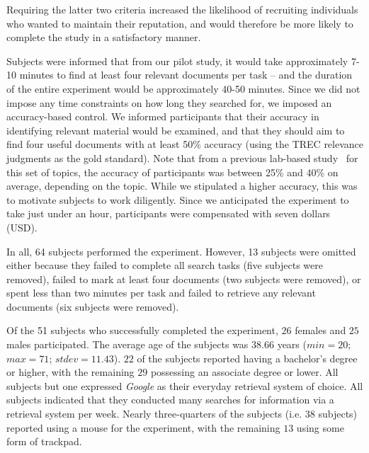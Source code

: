 Requiring the latter two criteria increased the likelihood of recruiting individuals who wanted to maintain their reputation, and would therefore be more likely to complete the study in a satisfactory manner. 

Subjects were informed that from our pilot study, it would take approximately 7-10 minutes to find at least four relevant documents per task -- and the duration of the entire experiment would be approximately 40-50 minutes. Since we did not impose any time constraints on how long they searched for, we imposed an accuracy-based control. We informed participants that their accuracy in identifying relevant material would be examined, and that they should aim to find four useful documents with at least 50\% accuracy (using the TREC relevance judgments as the gold standard). Note that from a previous lab-based study~\cite{maxwell2017snippet_length} for this set of topics, the accuracy of participants was between 25\% and 40\% on average, depending on the topic. While we stipulated a higher accuracy, this was to motivate subjects to work diligently. Since we anticipated the experiment to take just under an hour, participants were compensated with seven dollars (USD).

In all, 64 subjects performed the experiment. However, 13 subjects were omitted either because they failed to complete all search tasks (five subjects were removed), failed to mark at least four documents (two subjects were removed), or spent less than two minutes per task and failed to retrieve any relevant documents (six subjects were removed). 

Of the 51 subjects who successfully completed the experiment, $26$ females and $25$ males participated. The average age of the subjects was $38.66$ years ($min=20$; $max=71$; $stdev=11.43$). $22$ of the subjects reported having a bachelor's degree or higher, with the remaining $29$ possessing an associate degree or lower. All subjects but one expressed \emph{Google} as their everyday retrieval system of choice. All subjects indicated that they conducted many searches for information via a retrieval system per week. Nearly three-quarters of the subjects (i.e. 38 subjects) reported using a mouse for the experiment, with the remaining $13$ using some form of trackpad.

